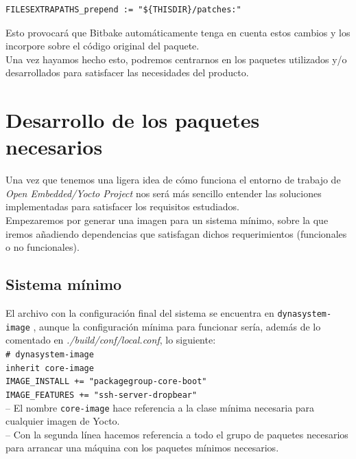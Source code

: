 \begin{lstlisting}
FILESEXTRAPATHS_prepend := "${THISDIR}/patches:"
\end{lstlisting}

Esto provocará que Bitbake automáticamente tenga en cuenta estos cambios y los incorpore sobre el código original del paquete.\\

Una vez hayamos hecho esto, podremos centrarnos en los paquetes utilizados y/o desarrollados para satisfacer las necesidades del producto.

\section{Desarrollo de los paquetes necesarios}

Una vez que tenemos una ligera idea de cómo funciona el entorno de trabajo de \textit{Open Embedded/Yocto Project} nos será más sencillo entender las soluciones implementadas para satisfacer los requisitos estudiados.\\

Empezaremos por generar una imagen para un sistema mínimo, sobre la que iremos añadiendo dependencias que satisfagan dichos requerimientos (funcionales o no funcionales).

\subsection{Sistema mínimo}

El archivo con la configuración final del sistema se encuentra en \texttt{dynasystem-image} \cite{dynasystem-image}, aunque la configuración mínima para funcionar sería, además de lo comentado en \textit{./build/conf/local.conf}, lo siguiente:\\

\texttt{\# dynasystem-image\\
inherit core-image\\
IMAGE\_INSTALL += "packagegroup-core-boot"\\
IMAGE\_FEATURES += "ssh-server-dropbear"}\\

-- El nombre \texttt{core-image} hace referencia a la clase mínima necesaria para cualquier imagen de Yocto.\\

-- Con la segunda línea hacemos referencia a todo el grupo de paquetes necesarios para arrancar una máquina con los paquetes mínimos necesarios.\\

